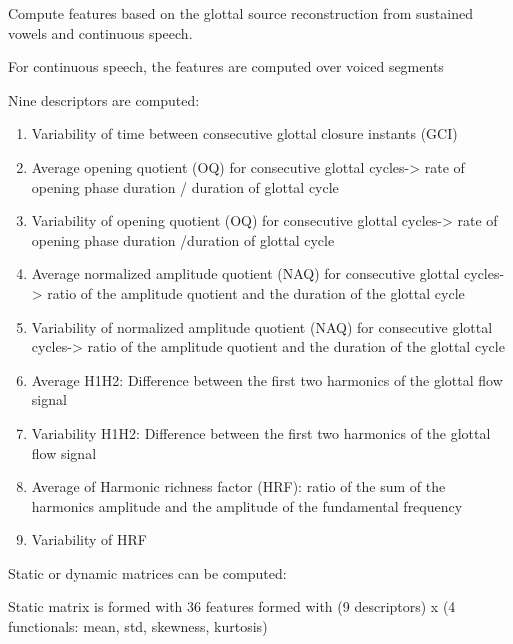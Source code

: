 \documentclass[letterpaper,10pt,english]{sphinxmanual}
\begin{document}
\begin{fulllineitems}
\label{\detokenize{Glottal:glottal.Glottal}}
Compute features based on the glottal source reconstruction from sustained vowels and continuous speech.

For continuous speech, the features are computed over voiced segments

Nine descriptors are computed:
\begin{enumerate}
\item {} 
Variability of time between consecutive glottal closure instants (GCI)

\item {} 
Average opening quotient (OQ) for consecutive glottal cycles-\textgreater{} rate of opening phase duration / duration of glottal cycle

\item {} 
Variability of opening quotient (OQ) for consecutive glottal cycles-\textgreater{} rate of opening phase duration /duration of glottal cycle

\item {} 
Average normalized amplitude quotient (NAQ) for consecutive glottal cycles-\textgreater{} ratio of the amplitude quotient and the duration of the glottal cycle

\item {} 
Variability of normalized amplitude quotient (NAQ) for consecutive glottal cycles-\textgreater{} ratio of the amplitude quotient and the duration of the glottal cycle

\item {} 
Average H1H2: Difference between the first two harmonics of the glottal flow signal

\item {} 
Variability H1H2: Difference between the first two harmonics of the glottal flow signal

\item {} 
Average of Harmonic richness factor (HRF): ratio of the sum of the harmonics amplitude and the amplitude of the fundamental frequency

\item {} 
Variability of HRF

\end{enumerate}

Static or dynamic matrices can be computed:

Static matrix is formed with 36 features formed with (9 descriptors) x (4 functionals: mean, std, skewness, kurtosis)


\end{fulllineitems}
\end{document}

